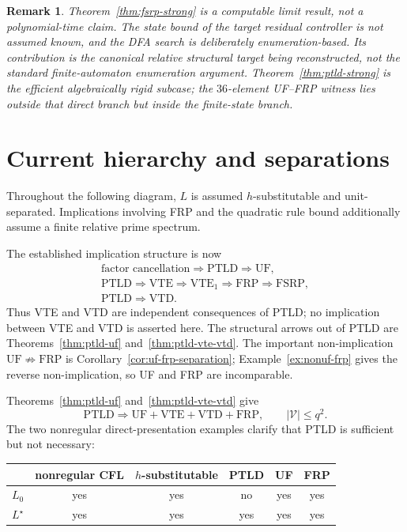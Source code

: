\documentclass[11pt,a4paper]{article}
\newtheorem{remark}[theorem]{Remark}
\newcommand{\Vcal}{\mathcal V}
\begin{document}
\begin{remark}
Theorem~\ref{thm:fsrp-strong} is a computable limit result, not a polynomial-time claim.  The state bound of the target residual controller is not assumed known, and the DFA search is deliberately enumeration-based.  Its contribution is the canonical relative structural target being reconstructed, not the standard finite-automaton enumeration argument.  Theorem~\ref{thm:ptld-strong} is the efficient algebraically rigid subcase; the $36$-element UF--FRP witness lies outside that direct branch but inside the finite-state branch.
\end{remark}

\section{Current hierarchy and separations}

Throughout the following diagram, $L$ is assumed $h$-substitutable and unit-separated.  Implications involving FRP and the quadratic rule bound additionally assume a finite relative prime spectrum.

The established implication structure is now
\[
\begin{gathered}
\text{factor cancellation}
\Longrightarrow
\mathrm{PTLD}
\Longrightarrow
\mathrm{UF},
\\[1mm]
\mathrm{PTLD}
\Longrightarrow
\mathrm{VTE}
\Longrightarrow
\mathrm{VTE}_1
\Longrightarrow
\mathrm{FRP}
\Longrightarrow
\mathrm{FSRP},
\\[1mm]
\mathrm{PTLD}
\Longrightarrow
\mathrm{VTD}.
\end{gathered}
\]
Thus VTE and VTD are independent consequences of PTLD; no implication between VTE and VTD is asserted here.
The structural arrows out of PTLD are Theorems~\ref{thm:ptld-uf} and~\ref{thm:ptld-vte-vtd}.  The important non-implication $\mathrm{UF}\not\Rightarrow\mathrm{FRP}$ is Corollary~\ref{cor:uf-frp-separation}; Example~\ref{ex:nonuf-frp} gives the reverse non-implication, so UF and FRP are incomparable.

Theorems~\ref{thm:ptld-uf} and~\ref{thm:ptld-vte-vtd} give
\[
  \mathrm{PTLD}\Longrightarrow \mathrm{UF}+\mathrm{VTE}+\mathrm{VTD}+\mathrm{FRP},
  \qquad |\Vcal|\le q^2.
\]
The two nonregular direct-presentation examples clarify that PTLD is sufficient but not necessary:
\begin{center}
\begin{tabular}{lccccc}
\toprule
 & nonregular CFL & $h$-substitutable & PTLD & UF & FRP\\
\midrule
$L_0$ & yes & yes & no & yes & yes\\
$L^\star$ & yes & yes & yes & yes & yes\\
\bottomrule
\end{tabular}
\end{center}
\end{document}
